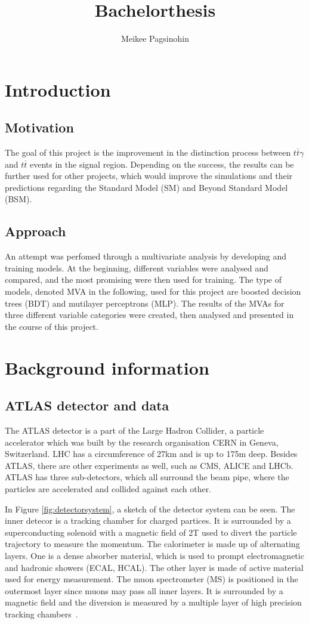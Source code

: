 \documentclass[11pt]{scrartcl}
\title{Bachelorthesis}
\author{Meikee Pagsinohin}
\begin{document}
\tableofcontents
\newpage

\section{Introduction}

	\subsection{Motivation}
		The goal of this project is the improvement in the distinction process between $t\overline{t}\gamma$ and $t\overline{t}$ events in the signal region. Depending on the success, the results can be further used for other projects, which would improve the simulations and their predictions regarding the Standard Model (SM) and Beyond Standard Model (BSM). 

	\subsection{Approach}
	\label{sec:approach}
		An attempt was perfomed through a multivariate analysis by developing and training models. At the beginning, different variables were analysed and compared, and the most promising were then used for training. The type of models, denoted MVA in the following, used for this project are boosted decision trees (BDT) and mutilayer perceptrons (MLP). The results of the MVAs for three different variable categories were created, then analysed and presented in the course of this project.

\section{Background information}
	\subsection{ATLAS detector and data}
	The ATLAS detector is a part of the Large Hadron Collider, a particle accelerator which was built by the research organisation CERN in Geneva, Switzerland. LHC has a circumference of 27km and is up to 175m deep. Besides ATLAS, there are other experiments as well, such as CMS, ALICE and LHCb. ATLAS has three sub-detectors, which all surround the beam pipe, where the particles are accelerated and collided against each other.
	
	In Figure \ref{fig:detectorsystem}, a sketch of the detector system can be seen. The inner detecor is a tracking chamber for charged partices. It is surrounded by a superconducting solenoid with a magnetic field of 2T used to divert the particle trajectory to measure the momentum. The calorimeter is made up of alternating layers. One is a dense absorber material, which is used to prompt electromagnetic and hadronic showers (ECAL, HCAL). The other layer is made of active material used for energy measurement. The muon spectrometer (MS) is positioned in the outermost layer since muons may pass all inner layers. It is surrounded by a magnetic field and the diversion is measured by a multiple layer of high precision tracking chambers~\cite{ATLAS, TTG}. 
	
\end{document}
